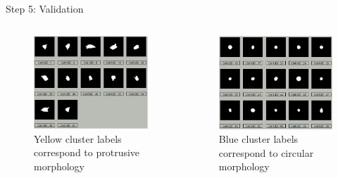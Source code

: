 \documentclass[final,hyperref={pdfpagelabels=false}]{beamer}
\begin{document}
\begin{frame}[t]
\begin{columns}[t]
\begin{column}{.31\textwidth}
\begin{block}{Step 5: Validation}
\begin{columns}
\begin{column}{.48\textwidth}
\centering
\begin{figure}
\includegraphics[width=0.99\linewidth]{cluster_fig3.png}
\captionsetup{justification=raggedright,singlelinecheck=false,labelformat=empty}
\caption{Yellow cluster labels correspond to protrusive morphology}
\end{figure}
\end{column}

\begin{column}{.48\textwidth}
\centering
\begin{figure}
\includegraphics[width=0.99\linewidth]{cluster_fig4.png}
\captionsetup{justification=raggedright,singlelinecheck=false,labelformat=empty}
\caption{Blue cluster labels correspond to circular morphology}
\end{figure}
\end{column}


\end{columns}
\end{block}
\end{column}
\end{columns}
\end{frame}
\end{document}
